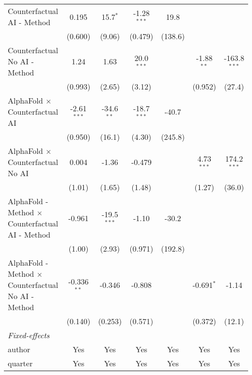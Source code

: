 \begin{tabular}{lcccccc}
   Counterfactual AI - Method                                 & 0.195         & 15.7$^{*}$    & -1.28$^{***}$ & 19.8    &              &   \\   
                                                              & (0.600)       & (9.06)        & (0.479)       & (138.6) &              &   \\   
   Counterfactual No AI - Method                              & 1.24          & 1.63          & 20.0$^{***}$  &         & -1.88$^{**}$ & -163.8$^{***}$\\   
                                                              & (0.993)       & (2.65)        & (3.12)        &         & (0.952)      & (27.4)\\   
   AlphaFold $\times$ Counterfactual AI                       & -2.61$^{***}$ & -34.6$^{**}$  & -18.7$^{***}$ & -40.7   &              &   \\   
                                                              & (0.950)       & (16.1)        & (4.30)        & (245.8) &              &   \\   
   AlphaFold $\times$ Counterfactual No AI                    & 0.004         & -1.36         & -0.479        &         & 4.73$^{***}$ & 174.2$^{***}$\\   
                                                              & (1.01)        & (1.65)        & (1.48)        &         & (1.27)       & (36.0)\\   
   AlphaFold - Method $\times$ Counterfactual AI - Method     & -0.961        & -19.5$^{***}$ & -1.10         & -30.2   &              &   \\   
                                                              & (1.00)        & (2.93)        & (0.971)       & (192.8) &              &   \\   
   AlphaFold - Method $\times$ Counterfactual No AI - Method  & -0.336$^{**}$ & -0.346        & -0.808        &         & -0.691$^{*}$ & -1.14\\   
                                                              & (0.140)       & (0.253)       & (0.571)       &         & (0.372)      & (12.1)\\   
   \midrule
   \emph{Fixed-effects}\\
   author                                                     & Yes           & Yes           & Yes           & Yes     & Yes          & Yes\\  
   quarter                                                    & Yes           & Yes           & Yes           & Yes     & Yes          & Yes\\  

\end{tabular}
